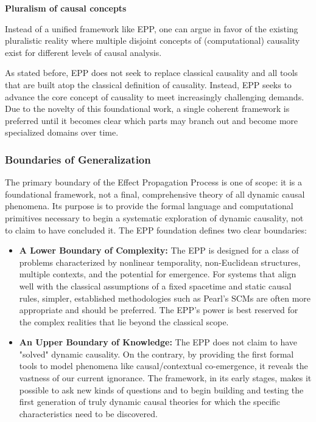 \textbf{Pluralism of causal concepts}

Instead of a unified framework like EPP, one can argue in favor of the existing pluralistic reality where multiple 
disjoint concepts of (computational) causality exist for different levels of causal analysis.

As stated before, EPP does not seek to replace classical causality and all tools that are built atop the classical
definition of causality. Instead, EPP seeks to advance the core concept of causality to meet increasingly challenging
demands. Due to the novelty of this foundational work, a single coherent framework is preferred until it becomes clear
which parts may branch out and become more specialized domains over time.


\subsubsection{Boundaries of Generalization}

The primary boundary of the Effect Propagation Process is one of scope: it is a foundational framework, not a final, comprehensive theory of all dynamic causal phenomena. 
Its purpose is to provide the formal language and computational primitives necessary to begin a systematic exploration of dynamic causality, not to claim to have concluded it. 
The EPP foundation defines two clear boundaries:


\begin{itemize}
    \item \textbf{A Lower Boundary of Complexity:} The EPP is designed for a class of problems characterized by
    nonlinear temporality, non-Euclidean structures, multiple contexts, and the potential for emergence. For systems
    that align well with the classical assumptions of a fixed spacetime and static causal rules, simpler, established
    methodologies such as Pearl's SCMs are often more appropriate and should be preferred. The EPP's power is best
    reserved for the complex realities that lie beyond the classical scope.

    \item \textbf{An Upper Boundary of Knowledge:} The EPP does not claim to have "solved" dynamic causality. On the
    contrary, by providing the first formal tools to model phenomena like causal/contextual co-emergence, it reveals
    the vastness of our current ignorance. The framework, in its early stages, makes it possible to ask new kinds of
    questions and to begin building and testing the first generation of truly dynamic causal theories for which the 
    specific characteristics need to be discovered.
\end{itemize}

